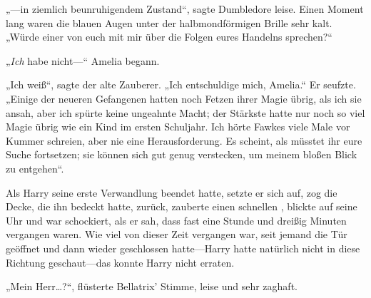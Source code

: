 „—in ziemlich beunruhigendem Zustand“, sagte Dumbledore leise. Einen Moment lang waren die blauen Augen unter der halbmondförmigen Brille sehr kalt.
„Würde einer von euch mit mir über die Folgen eures Handelns sprechen?“

„\emph{Ich} habe nicht—“ Amelia begann.

„Ich weiß“, sagte der alte Zauberer.
„Ich entschuldige mich, Amelia.“ Er seufzte.
„Einige der neueren Gefangenen hatten noch Fetzen ihrer Magie übrig, als ich sie ansah, aber ich spürte keine ungeahnte Macht; der Stärkste hatte nur noch so viel Magie übrig wie ein Kind im ersten Schuljahr. Ich hörte Fawkes viele Male vor Kummer schreien, aber nie eine Herausforderung. Es scheint, als müsstet ihr eure Suche fortsetzen; sie können sich gut genug verstecken, um meinem bloßen Blick zu entgehen“.

\later

Als Harry seine erste Verwandlung beendet hatte, setzte er sich auf, zog die Decke, die ihn bedeckt hatte, zurück, zauberte einen schnellen , blickte auf seine Uhr und war schockiert, als er sah, dass fast eine Stunde und dreißig Minuten vergangen waren. Wie viel von dieser Zeit vergangen war, seit jemand die Tür geöffnet und dann wieder geschlossen hatte—Harry hatte natürlich nicht in diese Richtung geschaut—das konnte Harry nicht erraten.

„Mein Herr…?“, flüsterte Bellatrix’ Stimme, leise und sehr zaghaft.

